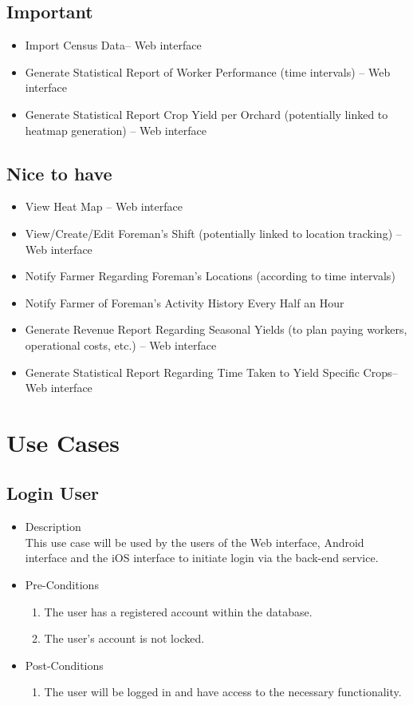 \documentclass[11pt,fleqn]{book} %
\begin{document}
		\subsection{Important}
			\begin{itemize}
				\item Import Census Data– Web interface
				\item Generate Statistical Report of Worker Performance (time intervals) – Web interface
				\item Generate Statistical Report Crop Yield per Orchard (potentially linked to heatmap generation) – Web interface				
			\end{itemize}		
		
		\subsection{Nice to have}
			\begin{itemize}
				\item View Heat Map – Web interface
				\item View/Create/Edit Foreman’s Shift (potentially linked to location tracking)  – Web interface
				\item Notify Farmer Regarding Foreman’s Locations (according to time intervals)
				\item Notify Farmer of Foreman’s Activity History Every Half an Hour
				\item Generate Revenue Report Regarding Seasonal Yields (to plan paying workers, operational costs, etc.) – Web interface
				\item Generate Statistical Report Regarding Time Taken to Yield Specific Crops– Web interface
				
			\end{itemize}
	\section{Use Cases}
		\subsection{Login User}
			\begin{itemize}
				\item Description\\
				This use case will be used by the users of the Web interface, Android interface and the iOS interface to initiate login via the back-end service.
				\item Pre-Conditions
				\begin{enumerate}
					\item The user has a registered account within the database.
					\item The user’s account is not locked.
				\end{enumerate}
				\item Post-Conditions
				\begin{enumerate}
					\item The user will be logged in and have access to the necessary functionality.
				\end{enumerate}
			\end{itemize}
		
\end{document}
